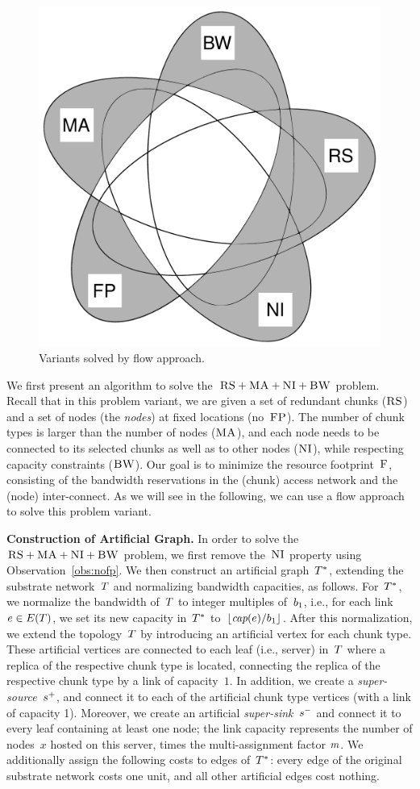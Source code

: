 \begin{figure}[t]
\centering
\includegraphics[width=0.49\columnwidth]{figs/static-mapping/venn_flow.pdf}
\caption{Variants solved by flow approach.}
\vspace{-1em}
\label{fig:venn_flow}
\end{figure}


We first present an algorithm to solve the~$\textsc{RS}+\textsc{MA}+\textsc{NI}+\textsc{BW}$ problem.
Recall that in this problem variant,
we are given a set of redundant chunks ($\textsc{RS}$) and a set of
nodes
(the \emph{nodes})
at fixed locations (no~$\textsc{FP}$). The number of chunk types is larger than the number
of nodes ($\textsc{MA}$), and each node needs to be connected
to its selected chunks as well as to other nodes ($\textsc{NI}$), while respecting
capacity constraints ($\textsc{BW}$).
Our goal is to minimize the resource footprint~$\textsc{F}$, consisting
of the bandwidth reservations in the (chunk) access network and the (node)
inter-connect.
As we will see in the following, we can use a flow approach to solve this
problem variant.




\textbf{Construction of Artificial Graph.}
In order to solve the~$\textsc{RS}+\textsc{MA}+\textsc{NI}+\textsc{BW}$ problem,
we first remove the~$\textsc{NI}$ property using Observation~\ref{obs:nofp}.
We then construct
an artificial graph~$T^*$, extending the substrate network~$T$ and
normalizing bandwidth capacities, as follows. For~$T^*$,
we normalize the bandwidth of~$T$ to integer multiples of~$b_1$,
i.e., for each link~$e\in E(T)$, we set its new
capacity in~$T^*$ to~$\lfloor\emph{cap}(e)/b_1\rfloor$.
After this normalization, we extend the topology~$T$ by
introducing an artificial vertex for each chunk type. These artificial
vertices are connected to each leaf (i.e., server) in~$T$ where a replica
 of the respective chunk type is located,
connecting the replica of the respective chunk type by a link of capacity~$1$. In
addition, we create a
\emph{super-source}~$s^{+}$, and connect it to each of the artificial chunk
type vertices (with a link of capacity 1). Moreover, we create an artificial \emph{super-sink}~$s^{-}$ and
connect it to every leaf containing at least one node; the link capacity represents
the number of nodes~$x$ hosted on this server, times the multi-assignment factor
$m$.
We additionally assign the following costs to edges of~$T^*$:
every edge of the original substrate network costs one unit, and all other artificial edges
cost nothing.

